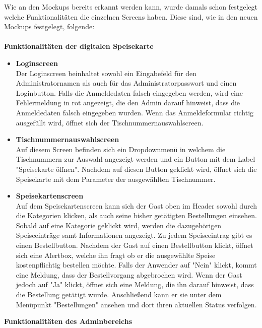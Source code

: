 Wie an den Mockups bereits erkannt werden kann, wurde damals schon festgelegt welche Funktionalitäten die einzelnen Screens haben.
Diese sind, wie in den neuen Mockups festgelegt, folgende:\\ \\ 
\textbf{Funktionalitäten der digitalen Speisekarte}
\begin{itemize}
    \item \textbf{Loginscreen}\\
Der Loginscreen beinhaltet sowohl ein Eingabefeld für den Administratornamen als auch für das Administratorpasswort und einen Loginbutton.
Falls die Anmeldedaten falsch eingegeben werden, wird eine Fehlermeldung in rot angezeigt, die den Admin darauf hinweist, dass die Anmeldedaten falsch eingegeben wurden.
Wenn das Anmeldeformular richtig ausgefüllt wird, öffnet sich der Tischnummernauswahlscreen.
    \item \textbf{Tischnummernauswahlscreen}\\
Auf diesem Screen befinden sich ein Dropdownmenü in welchem die Tischnummern zur Auswahl angezeigt werden und ein Button mit dem Label "Speisekarte öffnen". Nachdem auf diesen Button geklickt wird, öffnet sich die Speisekarte mit dem Parameter der ausgewählten Tischnummer.
\pagebreak
    \item \textbf{Speisekartenscreen}\\
Auf dem Speisekartenscreen kann sich der Gast oben im Header sowohl durch die Kategorien klicken, als auch seine bisher getätigten Bestellungen einsehen. 
Sobald auf eine Kategorie geklickt wird, werden die dazugehörigen Speiseeinträge samt Informationen angezeigt. Zu jedem Speiseeintrag gibt es einen Bestellbutton. 
Nachdem der Gast auf einen Bestellbutton klickt, öffnet sich eine Alertbox, welche ihn fragt ob er die ausgewählte Speise kostenpflichtig bestellen möchte. Falls der Anwender auf "Nein" klickt, kommt eine Meldung, dass der Bestellvorgang abgebrochen wird.
Wenn der Gast jedoch auf "Ja" klickt, öffnet sich eine Meldung, die ihn darauf hinweist, dass die Bestellung getätigt wurde. Anschließend kann er sie unter dem Menüpunkt "Bestellungen" ansehen und dort ihren aktuellen Status verfolgen.\\
  \end{itemize}
\textbf{Funktionalitäten des Adminbereichs} 

